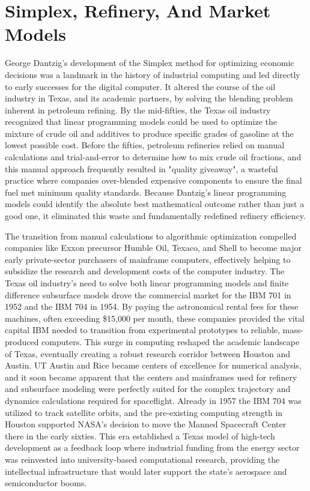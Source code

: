 \chapter{Simplex, Refinery, And Market Models}

George Dantzig’s development of the Simplex method for optimizing economic decisions was a landmark in the history of industrial computing and led directly to early successes for the digital computer. It altered the course of the oil industry in Texas, and its academic partners, by solving the blending problem inherent in petroleum refining. By the mid-fifties, the Texas oil industry recognized that linear programming models could be used to optimize the mixture of crude oil and additives to produce specific grades of gasoline at the lowest possible cost. Before the fifties, petroleum refineries relied on manual calculations and trial-and-error to determine how to mix crude oil fractions, and this manual approach frequently resulted in "quality giveaway", a wasteful practice where companies over-blended expensive components to ensure the final fuel met minimum quality standards. Because Dantzig's linear programming models could identify the absolute best mathematical outcome rather than just a good one, it eliminated this waste and fundamentally redefined refinery efficiency. \cite{charnesBlendingAviationGasolines1952} \cite{symondsLinearProgrammingSolution1955}

The transition from manual calculations to algorithmic optimization compelled companies like Exxon precursor Humble Oil, Texaco, and Shell to become major early private-sector purchasers of mainframe computers, effectively helping to subsidize the research and development costs of the computer industry. The Texas oil industry's need to solve both linear programming models and finite difference subsurface models drove the commercial market for the IBM 701 in 1952 and the IBM 704 in 1954. By paying the astronomical rental fees for these machines, often exceeding \$15,000 per month, these companies provided the vital capital IBM needed to transition from experimental prototypes to reliable, mass-produced computers. This surge in computing reshaped the academic landscape of Texas, eventually creating a robust research corridor between Houston and Austin. UT Austin and Rice became centers of excellence for numerical analysis, and it soon became apparent that the centers and mainframes used for refinery and subsurface modeling were perfectly suited for the complex trajectory and dynamics calculations required for spaceflight. Already in 1957 the IBM 704 was utilized to track satellite orbits, and the pre-existing computing strength in Houston supported NASA's decision to move the Manned Spacecraft Center there in the early sixties. This era established a Texas model of high-tech development as a feedback loop where industrial funding from the energy sector was reinvested into university-based computational research, providing the intellectual infrastructure that would later support the state's aerospace and semiconductor booms. \cite{garvinApplicationsLinearProgramming1957} \cite{enosPetroleumProgressProfits1962} \cite{larsonHistoryHumbleOil1959} 

